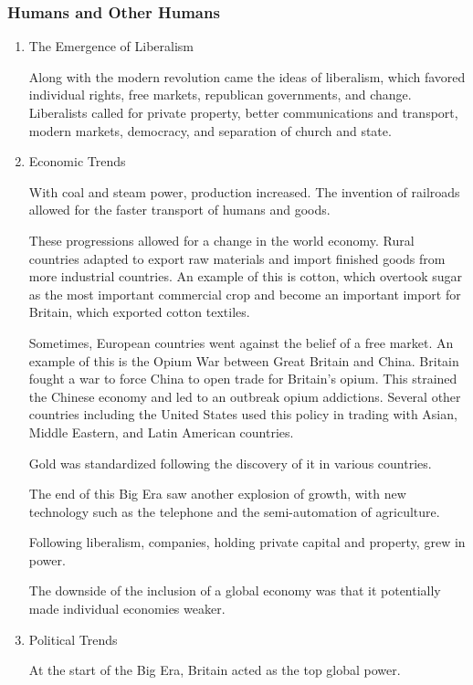 \documentclass[11pt]{article}
\begin{document}
\subsubsection{Humans and Other Humans}
\label{sec:orga32587e}
\begin{enumerate}
\item The Emergence of Liberalism
\label{sec:orgab5de09}

Along with the modern revolution came the ideas of liberalism, which favored individual rights, free markets, republican governments, and change. Liberalists called for private property, better communications and transport, modern markets, democracy, and separation of church and state.

\item Economic Trends
\label{sec:org3030f44}

With coal and steam power, production increased. The invention of railroads allowed for the faster transport of humans and goods.

These progressions allowed for a change in the world economy. Rural countries adapted to export raw materials and import finished goods from more industrial countries. An example of this is cotton, which overtook sugar as the most important commercial crop and become an important import for Britain, which exported cotton textiles.

Sometimes, European countries went against the belief of a free market. An example of this is the Opium War between Great Britain and China. Britain fought a war to force China to open trade for Britain's opium. This strained the Chinese economy and led to an outbreak opium addictions. Several other countries including the United States used this policy in trading with Asian, Middle Eastern, and Latin American countries.

Gold was standardized following the discovery of it in various countries.

The end of this Big Era saw another explosion of growth, with new technology such as the telephone and the semi-automation of agriculture.

Following liberalism, companies, holding private capital and property, grew in power.

The downside of the inclusion of a global economy was that it potentially made individual economies weaker.

\item Political Trends
\label{sec:orgfccec31}

At the start of the Big Era, Britain acted as the top global power.


\end{enumerate}
\end{document}
